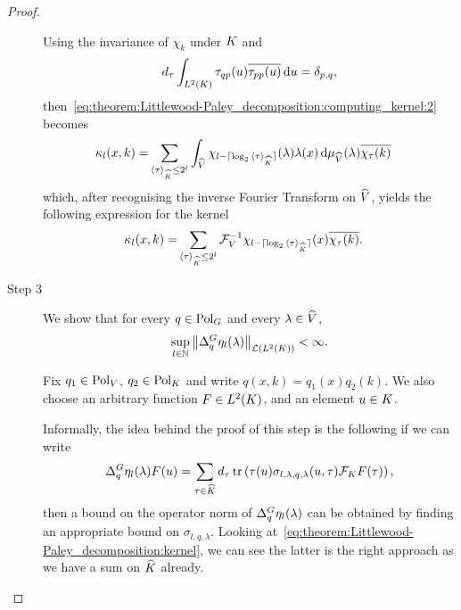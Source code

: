 \begin{proof}
\begin{description}
            Using the invariance of $\chi_{k}$ under $\CompactGroup$ and
            \begin{align*}
                \dimRep{\tau} \int_\Lebesgue{2}{\CompactGroup} \tau_{qp}(u) \conj{\tau_{pp}(u)} \dd u = \Kronecker{p}{q},
            \end{align*}
            then~\eqref{eq:theorem:Littlewood-Paley_decomposition:computing_kernel:2} becomes
            \begin{align*}
                \kappa_l (x, k)
                = &\sum_{\JapaneseBracket{\CompactGroup}{\tau} \leq 2^l}
                    \int_\dualGroup{\VectorSpace}
                        \chi_{l - \Ceiling{\log_2 \JapaneseBracket{\CompactGroup}{\tau}}}(\lambda) \lambda(x)
                    \dd \Plancherel{\VectorSpace}(\lambda)
                    \conj{\Character{\tau}(k)}
            \end{align*}
            which, after recognising the inverse Fourier Transform on $\dualGroup{\VectorSpace}$,
            yields the following expression for the kernel
            \begin{align}
                \kappa_l (x, k)
                = &\sum_{\JapaneseBracket{\CompactGroup}{\tau} \leq 2^l}
                    \InverseFourier[\VectorSpace]{\chi_{l - \Ceiling{\log_2 \JapaneseBracket{\CompactGroup}{\tau}}}}(x) \conj{\Character{\tau}(k)}.
                \label{eq:theorem:Littlewood-Paley_decomposition:kernel}
            \end{align}

        \item[Step 3] We show that for every $q \in \Polynomials{\Group}$
            and every $\lambda \in \dualGroup{\VectorSpace}$,
            \begin{align}
                \sup_{l \in \N} \norm[\Lin{\Lebesgue{2}{\CompactGroup}}]{\DifferenceOperator{q} \eta_l(\lambda)} < \infty.
            \end{align}

            Fix $q_1 \in \Polynomials{\VectorSpace}$, $q_2 \in \Polynomials{\CompactGroup}$
            and write $q(x, k) = q_1(x) q_2(k)$.
            We also choose an arbitrary function $F \in \Lebesgue{2}{\CompactGroup}$,
            and an element $u \in \CompactGroup$.

            Informally, the idea behind the proof of this step is the following
            if we can write
            \begin{align*}
                \DifferenceOperator{q} \eta_l(\lambda) F(u)
                = \sum_{\tau \in \dualGroup{\CompactGroup}}
                    \dimRep{\tau}
                    \tr\left( \tau(u) \sigma_{l, \lambda, q, \lambda}(u, \tau) \Fourier[\CompactGroup] F(\tau) \right),
            \end{align*}
            then a bound on the operator norm of $\DifferenceOperator{q} \eta_l (\lambda)$ can be obtained by finding an appropriate bound on $\sigma_{l, q, \lambda}$.
            Looking at~\eqref{eq:theorem:Littlewood-Paley_decomposition:kernel},
            we can see the latter is the right approach
            as we have a sum on $\dualGroup{\CompactGroup}$ already.


\end{description}
\end{proof}
